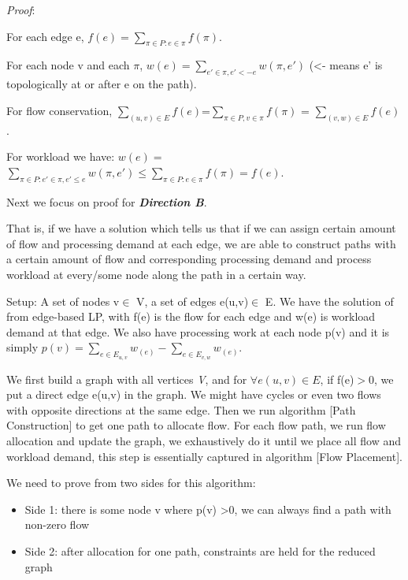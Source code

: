 \documentclass[twocolumn]{article}
\begin{document}
\textit{Proof}:

For each edge e, $f(e) =\sum\limits_{\pi\in P: e\in \pi} f(\pi)$.

For each node v and each $\pi$, $w(e) = \sum\limits_{e'\in \pi, e' <- e} w(\pi, e')$ (<- means e' is topologically at or after e on the path).

For flow conservation, $ \sum\limits_{(u,v)\in E} f(e) $=$ \sum\limits_{\pi\in P, v\in \pi} f(\pi)$ = $\sum\limits_{(v,w )\in E} f(e)$.

For workload we have:
$w(e) =$ 
$ \sum\limits_{\pi\in P: e'\in \pi, e' \leq e} w(\pi, e')\leq \sum\limits_{\pi\in P: e\in \pi} f(\pi) = f(e).  $\newline


Next we focus on proof for \textbf{\textit{Direction B}}.

That is, if we have a solution which tells us that if we can assign certain amount of flow and processing 
demand at each edge, we are able to construct paths with a certain amount of flow 
and corresponding processing demand and process workload at every/some node along the path in a certain way.


Setup:
A set of nodes  v$\in$ V, a set of edges e(u,v)$\in$ E. We have the solution of from edge-based LP, with 
f(e) is the flow for each edge and w(e) is workload demand at that edge. We also have processing work at each node p(v) and it is simply $p(v) = 
\sum\limits_{e \in E_{u, v} }w_(e) - \sum\limits_{e \in E_{v, w} }w_(e)  $.

We first build a graph with all vertices \textit{V}, and for $\forall e(u,v) \in E $, if f(e)$ >$0, we put a direct edge e(u,v) in the graph. We might have cycles or even two flows with opposite directions at the same edge. Then we run algorithm [Path Construction] to get one path to allocate flow. For each flow path, we run flow allocation and update the graph, we exhaustively do it until we place all flow and workload demand, this step is essentially captured in algorithm [Flow Placement]. 

We need to prove from two sides for this algorithm: 
\begin{itemize}
  \item {Side 1: there is some node v where p(v) >0, we can always find a path with non-zero flow}
   \item {Side 2: after allocation for one path, constraints are held for the reduced graph} 
\newline
\end{itemize}
\end{document}
